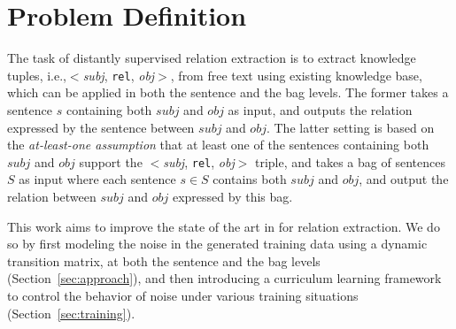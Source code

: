 \section{Problem Definition}
The task of distantly supervised relation extraction is to extract knowledge tuples, i.e.,$<$\emph{subj}, \texttt{rel}, \emph{obj}$>$, from free text using existing knowledge base, which can be applied in both the sentence and the bag
levels.  The former  takes a sentence $s$ containing both $subj$ and $obj$ as input, and outputs the relation expressed
by the sentence between $subj$ and $obj$. 
The latter setting is based on the \textit{at-least-one assumption} 
that at least one of the sentences containing both $subj$ and $obj$ support the $<$\emph{subj}, \texttt{rel}, \emph{obj}$>$ triple,
and takes a bag of sentences $S$ as input where each sentence
$s\in S$ contains both $subj$ and
$obj$, and output  the relation between $subj$ and $obj$ expressed by this bag.


This work aims to improve the state of the art in \DS for relation extraction.
We do so by first modeling the noise in the \DS generated training data using a dynamic transition matrix,  at both the sentence and the bag levels (Section~\ref{sec:approach}),  and then introducing a curriculum learning framework  to control the behavior of noise  under various training situations (Section~\ref{sec:training}).







